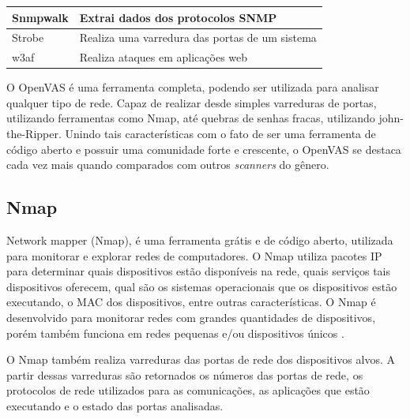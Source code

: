 \begin{table}[H]
\begin{tabular}{|l|l|}
Snmpwalk                         & Extrai dados dos protocolos SNMP                                                                                                         \\\hline
Strobe                           & Realiza uma varredura das portas de um sistema                                                                                          \\\hline
w3af                             & Realiza ataques em aplicações web
\\ \hline
\end{tabular}
\end{table}

O \gls{OpenVAS} é uma ferramenta completa, podendo ser utilizada para analisar qualquer tipo de rede. Capaz de realizar desde simples varreduras de portas, utilizando ferramentas como Nmap, até quebras de senhas fracas, utilizando john-the-Ripper. Unindo tais características com o fato de ser uma ferramenta de código aberto e possuir uma comunidade forte e crescente, o \gls{OpenVAS} se destaca cada vez mais quando comparados com outros \textit{scanners} do gênero.


\subsection{Nmap}
Network mapper (Nmap), é uma ferramenta grátis e de código aberto, utilizada para monitorar e explorar redes de computadores. O \gls{Nmap} utiliza pacotes \gls{IP} para determinar quais dispositivos estão disponíveis na rede, quais serviços tais dispositivos oferecem, qual são os sistemas operacionais que os dispositivos estão executando, o \gls{MAC} dos dispositivos, entre outras características. O \gls{Nmap} é desenvolvido para monitorar redes com grandes quantidades de dispositivos, porém também funciona  em redes pequenas e/ou dispositivos únicos \cite{lyon2009nmap}.

O \gls{Nmap} também realiza  varreduras das portas de rede dos dispositivos alvos. A partir dessas varreduras são retornados os números das portas de rede, os protocolos de rede utilizados para as comunicações, as aplicações que estão executando e o estado das portas analisadas.

